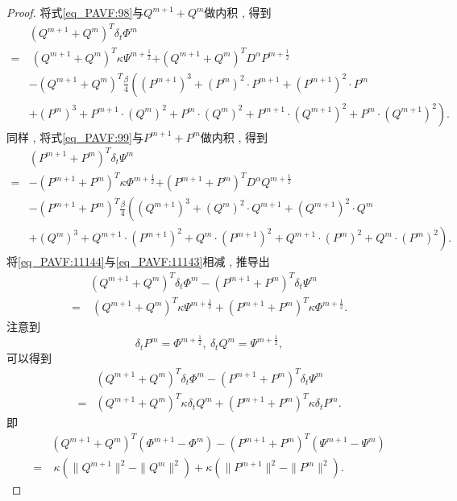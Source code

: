 \begin{proof}
将式\eqref{eq_PAVF:98}与$Q^{m+1}+Q^{m}$做内积 , 得到
\begin{align}
&(Q^{m+1}+Q^{m})^{T}\delta_{t} \varPhi^{m}\nonumber\\
=&~(Q^{m+1}+Q^{m})^{T}\kappa \Psi^{m+\frac{1}{2}}{+(Q^{m+1}+Q^{m})^{T}D^{\alpha} P^{m+\frac{1}{2}}}\nonumber\\
&-(Q^{m+1}+Q^{m})^{T}\frac{\beta}{4}\left((P^{m+1})^3+(P^{m})^{2}\cdot P^{m+1}+(P^{m+1})^{2}\cdot P^{m}\right . \nonumber\\
&\left . +(P^{m})^{3}+P^{m+1}\cdot (Q^{m})^{2}+P^{m}\cdot (Q^{m})^{2}+P^{m+1}\cdot (Q^{m+1})^{2}+P^{m}\cdot (Q^{m+1})^{2}\right) . \label{eq_PAVF:11143}
\end{align}
同样 , 将式\eqref{eq_PAVF:99}与$P^{m+1}+P^{m}$做内积 , 得到
\begin{align}
&(P^{m+1}+P^{m})^{T}\delta_{t} \Psi^{m}\nonumber\\
=&-(P^{m+1}+P^{m})^{T}\kappa \varPhi^{m+\frac{1}{2}}{+(P^{m+1}+P^{m})^{T}D^{\alpha} Q^{m+\frac{1}{2}}}\nonumber\\
&-(P^{m+1}+P^{m})^{T}\frac{\beta}{4}\left((Q^{m+1})^3+(Q^{m})^{2}\cdot Q^{m+1}+(Q^{m+1})^{2}\cdot Q^{m}\right . \nonumber\\
&\left . +(Q^{m})^{3}+Q^{m+1}\cdot (P^{m+1})^{2}+Q^{m}\cdot (P^{m+1})^{2}+Q^{m+1}\cdot (P^{m})^{2}+Q^{m}\cdot (P^{m})^{2}\right) . \label{eq_PAVF:11144}
\end{align}
将\eqref{eq_PAVF:11144}与\eqref{eq_PAVF:11143}相减 , 推导出
\begin{align}
&(Q^{m+1}+Q^{m})^{T}\delta_{t} \varPhi^{m}-(P^{m+1}+P^{m})^{T}\delta_{t} \Psi^{m}\nonumber\\
=&~(Q^{m+1}+Q^{m})^{T}\kappa \Psi^{m+\frac{1}{2}}+(P^{m+1}+P^{m})^{T}\kappa \varPhi^{m+\frac{1}{2}} . \label{eq_PAVF:11145}
\end{align}
注意到
$$\delta_t P^m=\varPhi^{m+\frac{1}{2}} , ~\delta_t Q^m=\Psi^{m+\frac{1}{2}} , $$
可以得到
\begin{align}\label{eq_PAVF:11146}
&(Q^{m+1}+Q^{m})^{T}\delta_{t} \varPhi^{m}\!-\!(P^{m+1}+P^{m})^{T}\delta_{t} \Psi^{m}\nonumber\\
=&(Q^{m+1}+Q^{m})^{T}\kappa \delta_t Q^m+(P^{m+1}+P^{m})^{T}\kappa \delta_t P^m . 
\end{align}
即
\begin{align}
&(Q^{m+1}+Q^{m})^{T}(\varPhi^{m+1}-\varPhi^{m})-(P^{m+1}+P^{m})^{T}(\Psi^{m+1}-\Psi^{m})\nonumber\\
=&~\kappa (\|Q^{m+1}\|^2-\|Q^{m}\|^2)+\kappa (\|P^{m+1}\|^2-\|P^{m}\|^2) . \label{eq_PAVF:11147}

\end{align}
\end{proof}

